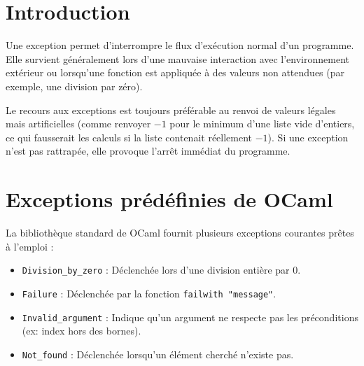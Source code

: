 \documentclass{article}
\begin{document}

\section{Introduction}

Une exception permet d'interrompre le flux d'exécution normal d'un programme. Elle survient généralement lors d'une mauvaise interaction avec l'environnement extérieur ou lorsqu'une fonction est appliquée à des valeurs non attendues (par exemple, une division par zéro).


\noindent Le recours aux exceptions est toujours préférable au renvoi de valeurs légales mais artificielles (comme renvoyer $-1$ pour le minimum d'une liste vide d'entiers, ce qui fausserait les calculs si la liste contenait réellement $-1$). Si une exception n'est pas rattrapée, elle provoque l'arrêt immédiat du programme.

\section{Exceptions prédéfinies de OCaml}

La bibliothèque standard de OCaml fournit plusieurs exceptions courantes prêtes à l'emploi :

\begin{itemize}
    \item \texttt{Division\_by\_zero} : Déclenchée lors d'une division entière par $0$.
    \item \texttt{Failure} : Déclenchée par la fonction \texttt{failwith "message"}.
    \item \texttt{Invalid\_argument} : Indique qu'un argument ne respecte pas les préconditions (ex: index hors des bornes).
    \item \texttt{Not\_found} : Déclenchée lorsqu'un élément cherché n'existe pas.
\end{itemize}

\end{document}
